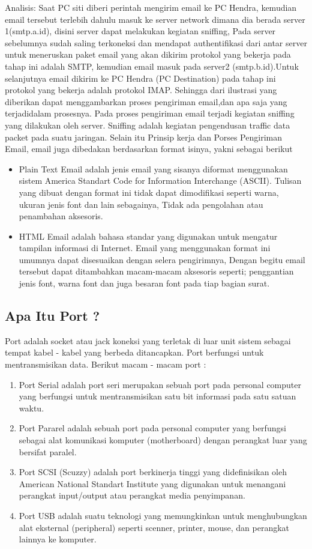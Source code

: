 \begin{enumerate}
Analisis: Saat PC siti diberi perintah mengirim email ke PC Hendra, kemudian email tersebut terlebih dahulu masuk ke server network dimana dia berada server 1(smtp.a.id), disini server dapat melakukan kegiatan sniffing, Pada server sebelumnya sudah saling terkoneksi dan mendapat authentifikasi dari antar server untuk meneruskan paket email yang akan dikirim protokol yang bekerja pada tahap ini adalah SMTP, kemudian email masuk pada server2 (smtp.b.id).Untuk selanjutnya email dikirim ke PC Hendra (PC Destination) pada tahap ini protokol yang bekerja adalah protokol IMAP. Sehingga dari ilustrasi yang diberikan dapat menggambarkan proses pengiriman email,dan apa saja yang terjadidalam prosesnya. 
Pada proses pengiriman email terjadi kegiatan sniffing yang dilakukan oleh server. Sniffing adalah kegiatan pengendusan traffic data packet pada suatu jaringan. 
Selain itu Prinsip kerja dan Porses Pengiriman Email, email juga dibedakan berdasarkan format isinya, yakni sebagai berikut
\begin{itemize} 
\item Plain Text Email adalah jenis email yang sisanya diformat menggunakan sistem America Standart Code for Information Interchange (ASCII). Tulisan yang dibuat dengan format ini tidak dapat dimodifikasi seperti warna, ukuran jenis font dan lain sebagainya, Tidak ada pengolahan atau penambahan aksesoris. 
\item HTML Email adalah bahasa standar yang digunakan untuk mengatur tampilan informasi di Internet. Email yang menggunakan format ini umumnya dapat disesuaikan dengan selera pengirimnya, Dengan begitu email tersebut dapat ditambahkan macam-macam aksesoris seperti; penggantian jenis font, warna font dan juga besaran font pada tiap bagian surat.
\end{itemize}
\subsection {Apa Itu Port ?} 
Port adalah socket atau jack koneksi yang terletak di luar unit sistem sebagai tempat kabel - kabel yang berbeda ditancapkan. Port berfungsi untuk mentransmisikan data. Berikut macam - macam port : 
\begin{enumerate}
\item Port Serial adalah port seri merupakan sebuah port pada personal computer yang berfungsi untuk mentransmisikan satu bit informasi pada satu satuan waktu. 
\item Port Pararel adalah sebuah port pada personal computer yang berfungsi sebagai alat komunikasi komputer (motherboard) dengan perangkat luar yang bersifat paralel. 
\item Port SCSI (Scuzzy) adalah port berkinerja tinggi yang didefinisikan oleh American National Standart Institute yang digunakan untuk menangani perangkat input/output atau perangkat media penyimpanan. 
\item Port USB adalah suatu teknologi yang memungkinkan untuk menghubungkan alat eksternal (peripheral) seperti scenner, printer, mouse, dan perangkat lainnya ke komputer. \par
\end{enumerate}

\end{enumerate}
